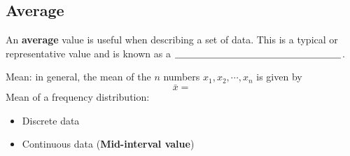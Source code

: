 \newpage

\subsection{Average}

An \textbf{average} value is useful when describing a set of data. This is a typical or representative value and is known as a $\underline{\hspace{6 cm}}$.

\medskip

Mean: in general, the mean of the $n$ numbers $x_1,x_2,\cdots, x_n$ is given by
\[
\bar{x} = 
\]
Mean of a frequency distribution:
\begin{itemize}
	\item Discrete data
	\item Continuous data (\textbf{Mid-interval value})
	
	
	
\end{itemize}


\exercise  %

